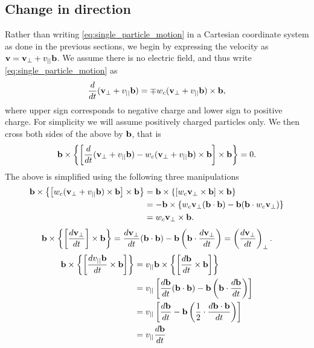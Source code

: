\documentclass[oneside,a4paper,11pt]{report}
\begin{document}
\subsection{Change in direction}
Rather than writing \cref{eq:single_particle_motion} in a Cartesian coordinate system as done in the previous sections, we begin by expressing the velocity as $\mathbf{v} = \mathbf{v}_\perp + v_{||} \mathbf{b}$. We assume there is no electric field, and thus write \cref{eq:single_particle_motion} as
\begin{equation}
    \frac{d}{dt} ( \mathbf{v}_\perp + v_{||} \mathbf{b}) = \mp w_c (\mathbf{v}_\perp + v_{||} \mathbf{b} ) \times \mathbf{b},
\end{equation}
where upper sign corresponds to negative charge and lower sign to positive charge. For simplicity we will assume positively charged particles only. We then cross both sides of the above by $\mathbf{b}$, that is
\begin{equation}
    \mathbf{b} \times \left \{ \left [ \frac{d}{dt} ( \mathbf{v}_\perp + v_{||} \mathbf{b}) - w_c ( \mathbf{v}_\perp + v_{||} \mathbf{b}) \times \mathbf{b} \right ] \times \mathbf{b} \right \} = 0.
\end{equation}
The above is simplified using the following three manipulations
\begin{align}
    \mathbf{b} \times \left \{ \left [ w_c ( \mathbf{v}_\perp + v_{||} \mathbf{b}) \times \mathbf{b} \right] \times \mathbf{b} \right \} &= \mathbf{b} \times \left \{ \left [ w_c \mathbf{v}_\perp \times \mathbf{b} \right] \times \mathbf{b} \right \} \nonumber \\
    & = -\mathbf{b} \times \left \{ w_c \mathbf{v}_\perp ( \mathbf{b} \cdot \mathbf{b}) - \mathbf{b} (\mathbf{b} \cdot w_c \mathbf{v}_\perp ) \right \} \nonumber \\
    & = w_c \mathbf{v}_\perp \times \mathbf{b}.
\end{align}
\begin{equation}
    \mathbf{b} \times \left \{ \left [ \frac{d\mathbf{v}_\perp}{dt} \right] \times \mathbf{b} \right \} = \frac{d \mathbf{v}_\perp}{dt}( \mathbf{b} \cdot \mathbf{b}) - \mathbf{b} \left(\mathbf{b} \cdot \frac{d\mathbf{v}_\perp}{dt} \right ) = \left ( \frac{d \mathbf{v}_\perp}{dt} \right)_\perp.
\end{equation}
\begin{align}
    \mathbf{b} \times \left \{ \left [ \frac{d v_{||} \mathbf{b}}{dt} \times \mathbf{b} \right] \right \} &= v_{||} \mathbf{b} \times \left \{ \left [ \frac{ d\mathbf{b}}{dt} \times \mathbf{b} \right] \right \} \nonumber \\
    & = v_{||} \left [ \frac{d \mathbf{b}}{dt} ( \mathbf{b} \cdot \mathbf{b}) - \mathbf{b} \left ( \mathbf{b} \cdot \frac{d \mathbf{b}}{dt} \right ) \right ] \nonumber \\
    & = v_{||} \left [ \frac{d \mathbf{b}}{dt} - \mathbf{b} \left ( \frac{1}{2} \cdot \frac{d \mathbf{b} \cdot \mathbf{b}}{dt} \right ) \right ] \nonumber \\
    & = v_{||} \frac{d \mathbf{b}}{dt}
\end{align}
\end{document}
